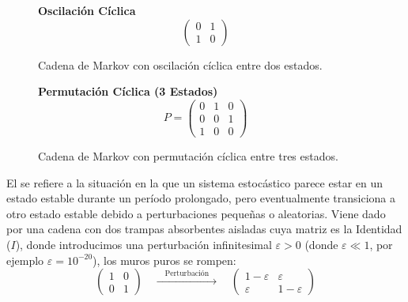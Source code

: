 \begin{figure}
    \centering
    \textbf{Oscilación Cíclica}
    \[ \begin{pmatrix} 0 & 1 \\ 1 & 0 \end{pmatrix} \]
    \caption{Cadena de Markov con oscilación cíclica entre dos estados.}
    \label{fig:oscilacionciclica}
\end{figure}

\begin{figure}
    \centering
    \textbf{Permutación Cíclica (3 Estados)}
    \[ P = \begin{pmatrix} 0 & 1 & 0 \\ 0 & 0 & 1 \\ 1 & 0 & 0 \end{pmatrix} \]
    \caption{Cadena de Markov con permutación cíclica entre tres estados.}
    \label{fig:permutacionciclica}
\end{figure}

\begin{definicion}
    El  se refiere a la situación en la que un sistema estocástico parece estar en un estado estable durante un período prolongado, pero eventualmente transiciona a otro estado estable debido a perturbaciones pequeñas o aleatorias. Viene dado por una cadena con dos trampas absorbentes aisladas cuya matriz es la Identidad ($I$), donde introducimos una perturbación infinitesimal $\varepsilon > 0$ (donde $\varepsilon \ll 1$, por ejemplo $\varepsilon = 10^{-20}$), los muros puros se rompen:
    \[
    \begin{pmatrix} 1 & 0 \\ 0 & 1 \end{pmatrix} \quad \xrightarrow{\quad \text{Perturbación} \quad} \quad \begin{pmatrix} 1-\varepsilon & \varepsilon \\ \varepsilon & 1-\varepsilon \end{pmatrix}
    \]
\end{definicion}

